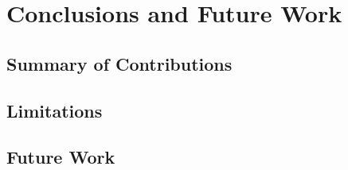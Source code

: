 
\chapter{Conclusions and Future Work}
\label{ch:07conclusions}


\FloatBarrier
\section{Summary of Contributions}
\label{sec:contrib}

\FloatBarrier
\section{Limitations}
\label{sec:limit}

\FloatBarrier
\section{Future Work}
\label{sec:fwork}